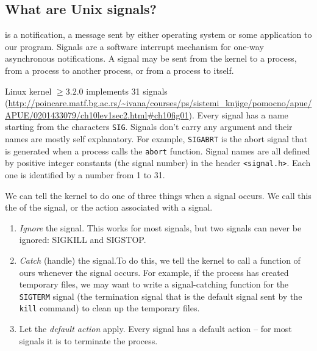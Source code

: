 \documentclass[a4paper]{article}
\begin{document}
\subsection{What are Unix signals?}
\begin{definition}
 is a notification, a message sent by either operating system or some application to our program. Signals are a software interrupt mechanism for one-way asynchronous notifications. A signal may be sent from the kernel to a process, from a process to another process, or from a process to itself.
\end{definition}
Linux kernel $\geq 3.2.0$ implements 31 signals (\url{http://poincare.matf.bg.ac.rs/~ivana/courses/ps/sistemi_knjige/pomocno/apue/APUE/0201433079/ch10lev1sec2.html#ch10fig01}). Every signal has a name starting from the characters  \texttt{SIG}. Signals don't carry any argument and their names are mostly self explanatory. For example, \texttt{SIGABRT} is the abort signal that is generated when a process calls the \texttt{abort}
function. Signal names are all defined by positive integer constants (the signal number) in the
header \texttt{<signal.h>}. Each one is identified by a number from 1 to 31. 

We can tell the kernel to do one of three things when a signal occurs. We call this the  of the signal, or the action associated with a signal.

\begin{enumerate}
    \item \textit{Ignore} the signal. This works for most signals, but two signals can never be
ignored: SIGKILL and SIGSTOP.
    \item \textit{Catch} (handle) the signal.To do this, we tell the kernel to call a function of ours
whenever the signal occurs. For example, if
the process has created temporary files, we may want to write a signal-catching
function for the \texttt{SIGTERM} signal (the termination signal that is the default signal
sent by the \texttt{kill} command) to clean up the temporary files.
    \item Let the \textit{default action} apply. Every signal has a default action -- for most signals it is to terminate the
process.
\end{enumerate}
\end{document}

